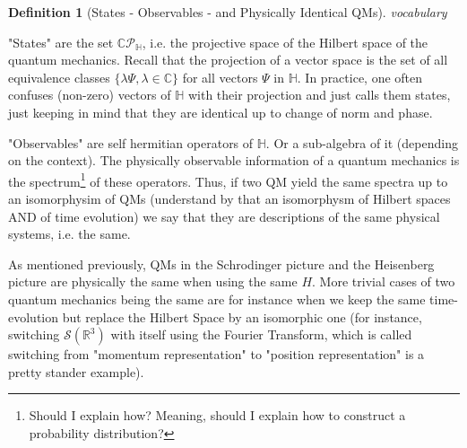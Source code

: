 \documentclass[a4paper,11pt]{article}
\numberwithin{equation}{section}
\theoremstyle{definition}
\newtheorem{definition}{Definition}
\begin{document}
\begin{definition}[States - Observables - and Physically Identical QMs] \emph{vocabulary}


"States" are the set $\mathbb{C}\mathcal{P}_\mathbb{H}$, i.e. the projective space of the Hilbert space of the quantum mechanics. Recall that the projection of a vector space is the set of all equivalence classes $\{\lambda \Psi, \lambda\in\mathbb{C}\}$ for all vectors $\Psi$ in $\mathbb{H}$. In practice, one often confuses (non-zero) vectors of $\mathbb{H}$ with their projection and just calls them states, just keeping in mind that they are identical up to change of norm and phase.

"Observables" are self hermitian operators of $\mathbb{H}$. Or a sub-algebra of it (depending on the context). The physically observable information of a quantum mechanics is the spectrum\footnote{\color{red}Should I explain how? Meaning, should I explain how to construct a probability distribution?\color{black}} of these operators. Thus, if two QM yield the same spectra up to an isomorphysim of QMs (understand by that an isomorphysm of Hilbert spaces AND of time evolution) we say that they are descriptions of the same physical systems, i.e. the same.

As mentioned previously, QMs in the Schrodinger picture and the Heisenberg picture are physically the same when using the same $H$. More trivial cases of two quantum mechanics being the same are for instance when we keep the same time-evolution but replace the Hilbert Space by an isomorphic one (for instance, switching $\mathcal{S}(\mathbb{R}^3)$ with itself using the Fourier Transform, which is called switching from "momentum representation" to "position representation" is a pretty stander example).    
\end{definition}
\end{document}
